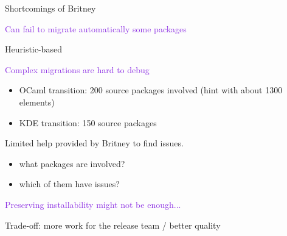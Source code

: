 \documentclass[xcolor={dvipsnames}]{beamer}
\newcommand{\EEE}[1]{\textcolor{BlueViolet}{#1}}
\begin{document}
\begin{frame}[fragile]{Shortcomings of Britney}

\EEE{Can fail to migrate automatically some packages}

Heuristic-based

\vspace{1.5em}

\EEE{Complex migrations are hard to debug}

\begin{itemize}
\item OCaml transition:
200 source packages involved (hint with about 1300 elements)
\item KDE transition: 150 source packages
\end{itemize}
Limited help provided by Britney to find issues.
\begin{itemize}
\item what packages are involved?
\item which of them have issues?
\end{itemize}

\vspace{1.5em}

\EEE{Preserving installability might not be enough...}

Trade-off: more work for the release team / better quality

\end{frame}
\end{document}
